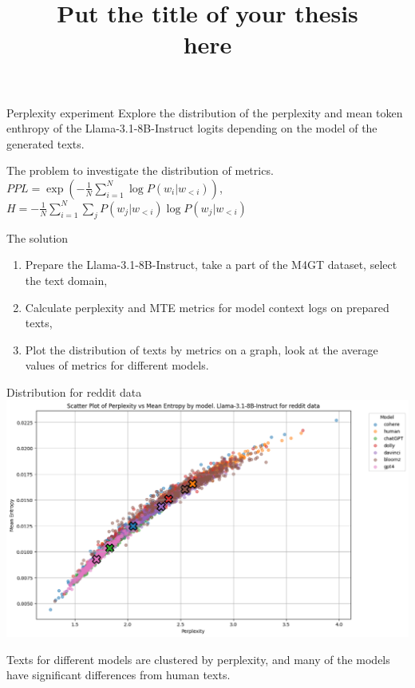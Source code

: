 \documentclass[12pt,pdf,hyperref={unicode}]{beamer}
\title{ Put the title of your thesis \\ here}
\begin{document}
\setcounter{page}{1}%
\begin{frame}{Perplexity experiment}
 Explore the distribution of the perplexity and mean token enthropy of the Llama-3.1-8B-Instruct logits depending on the model of the generated texts.
\begin{block}{The problem}
to investigate the distribution of metrics. $PPL  = \exp\left(-\frac{1}{N} \sum_{i=1}^{N} \log P(w_i | w_{<i})\right)$, $H = -\frac{1}{N} \sum_{i=1}^{N} \sum_{j} P(w_j | w_{<i}) \log P(w_j | w_{<i})$
\end{block}
\begin{block}{The solution}
\begin{enumerate}[1)]
\item Prepare the Llama-3.1-8B-Instruct, take a part of the M4GT dataset, select the text domain,
\item Calculate perplexity and MTE metrics for model context logs on prepared texts,
\item Plot the distribution of texts by metrics on a graph, look at the average values of metrics for different models.
\end{enumerate}
\end{block}
\end{frame}
\begin{frame}{Distribution for reddit data}
\includegraphics[width=1\textwidth]{reddit.png}   

Texts for different models are clustered by perplexity, and many of the models have significant differences from human texts. 
\end{frame}
\end{document}
